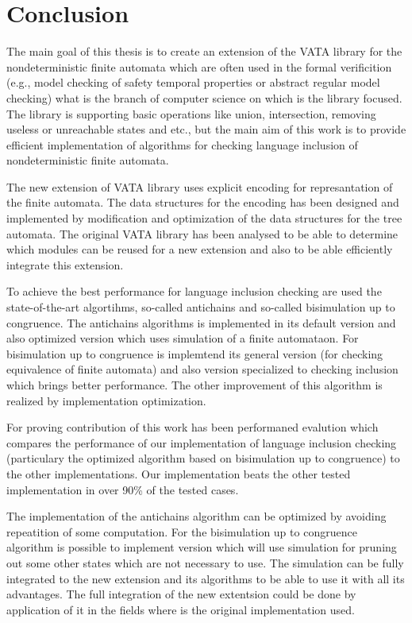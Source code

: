 \chapter{Conclusion}
\label{concl}
The main goal of this thesis is to create an extension of the VATA library for the nondeterministic finite automata 
which are often used in the formal verificition (e.g., model checking of safety temporal properties or 
abstract regular model checking) what is the branch of computer science on which is the library focused. The library is supporting
basic operations like union, intersection, removing useless or unreachable states and etc., but the main aim of this work is to provide
efficient implementation of algorithms for checking language inclusion of nondeterministic finite automata.

The new extension of VATA library uses explicit encoding for represantation of the finite automata. The data structures for the encoding has been designed
and implemented by modification and optimization of the data structures for the tree automata. The original VATA library has been analysed to be able to determine
which modules can be reused for a new extension and also to be able efficiently integrate this extension.

To achieve the best performance for language inclusion checking are used the state-of-the-art algortihms, so-called antichains and so-called bisimulation
up to congruence. The antichains algorithms is implemented in its default version and also optimized version which uses simulation of a finite automataon. 
For bisimulation up to congruence is implemtend its general version (for checking equivalence of finite automata) and also 
version specialized to checking inclusion which brings better performance. The other improvement of this algorithm is realized by implementation optimization.

For proving contribution of this work has been performaned evalution which compares the performance of our implementation of language
inclusion checking (particulary the optimized algorithm based on bisimulation up to congruence) to the other implementations. 
Our implementation beats the other tested implementation in over 90\% of the tested cases.

The implementation of the antichains algorithm can be optimized by avoiding repeatition of some computation. For the bisimulation up to congruence
algorithm is possible to implement version which will use simulation for pruning out some other states which are not necessary to use. The simulation can be
fully integrated to the new extension and its algorithms to be able to use it with all its advantages. The full integration of the new extentsion could be done
by application of it in the fields where is the original implementation used.
